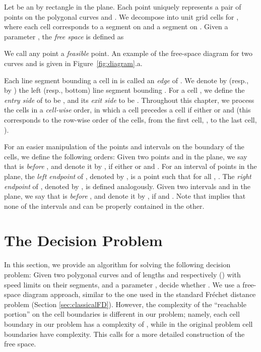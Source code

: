 \documentclass[12pt]{dalthesis}
\newcommand{\Frechet}{Fr\'echet }
\begin{document}
Let  be an  by  rectangle  in the plane.
Each point  uniquely represents a pair of points
 on the polygonal curves  and .
We decompose  into
 unit grid cells 
for ,
where each cell  corresponds to
a segment  on  and a segment  on .
Given a parameter ,
the {\em free space\/}  is defined as

We call any point  a {\em feasible\/} point.
An example of the free-space diagram for two curves  and  
is given in Figure~\ref{fig:diagram}.a.





Each line segment bounding a cell in  is called an {\em edge\/} of .
We denote by  (resp., by ) the left (resp., bottom) line segment bounding .
For a cell , we define the {\em entry side\/} of  to be ,
and its {\em exit side\/} to be .
Throughout this chapter, we process the cells in a {\em cell-wise\/} order,
in which a cell  precedes a cell  if either 
or   and  (this corresponds to the row-wise order of the cells,
from the first cell, , to the last cell, ). 

For an easier manipulation of the points and intervals on the boundary of the cells,
we define the following orders:
Given two points  and  in the plane, we say that 
 is {\em before\/} , and denote it by , if either  or   and  .
For an interval  of points in the plane, the {\em left endpoint\/} of , denoted by ,
is a point  such that  for all , .
The {\em right endpoint\/} of , denoted by , is defined analogously.
Given two intervals  and  in the plane,
we say that  is {\em before\/} , and denote it by , if
 and .
Note that   implies that none of the intervals  and 
can be properly contained in the other.







\section{The Decision Problem} \label{sec:decisionSpeed}

In this section, we provide an algorithm for solving the following decision problem:
Given two polygonal curves  and  of lengths  and  respectively ()
with speed limits on their segments, 
and a parameter ,
decide whether .
We use a free-space diagram approach, similar to the one used in the standard \Frechet distance problem (Section \ref{sec:classicalFD}).
However, the complexity of the ``reachable portion'' on the cell boundaries is different 
in our problem; namely, each cell boundary in our problem has a complexity of ,
while in the original problem cell boundaries have  complexity. 
This calls for a more detailed construction of the free space. 
\end{document}
